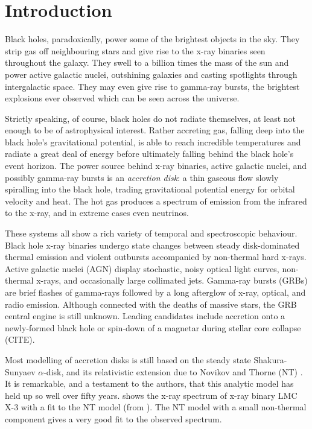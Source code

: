 \chapter*{Introduction}


Black holes, paradoxically, power some of the brightest objects in the sky.  They strip gas off neighbouring stars and give rise to the x-ray binaries seen throughout the galaxy.  They swell to a billion times the mass of the sun and power active galactic nuclei, outshining galaxies and casting spotlights through intergalactic space.  They may even give rise to gamma-ray bursts, the brightest explosions ever observed which can be seen across the universe.

Strictly speaking, of course, black holes do not radiate themselves, at least not enough to be of astrophysical interest.  Rather accreting gas, falling deep into the black hole's gravitational potential, is able to reach incredible temperatures and radiate a great deal of energy before ultimately falling behind the black hole's event horizon.  The power source behind x-ray binaries, active galactic nuclei, and possibly gamma-ray bursts is an \emph{accretion disk}: a thin gaseous flow slowly spiralling into the black hole, trading gravitational potential energy for orbital velocity and heat.  The hot gas produces a spectrum of emission from the infrared to the x-ray, and in extreme cases even neutrinos.

These systems all show a rich variety of temporal and spectroscopic behaviour.  Black hole x-ray binaries undergo state changes between steady disk-dominated thermal emission and violent outbursts accompanied by non-thermal hard x-rays.  Active galactic nuclei (AGN) display stochastic, noisy optical light curves, non-thermal x-rays, and occasionally large collimated jets.  Gamma-ray bursts (GRBs) are brief flashes of gamma-rays followed by a long afterglow of x-ray, optical, and radio emission.  Although connected with the deaths of massive stars, the GRB central engine is still unknown.  Leading candidates include accretion onto a newly-formed black hole or spin-down of a magnetar during stellar core collapse (CITE).

Most modelling of accretion disks is still based on the steady state Shakura-Sunyaev $\alpha$-disk, and its relativistic extension due to Novikov and Thorne (NT) \citep{ShakuraSunyaev, Novikov73}.  It is remarkable, and a testament to the authors, that this analytic model has held up so well over fifty years.   shows the x-ray spectrum of x-ray binary LMC X-3 with a fit to the NT model (from \citealt{Steiner14}).  The NT model with a small non-thermal component gives a very good fit to the observed spectrum.

